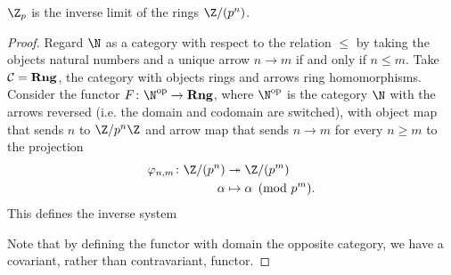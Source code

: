 \documentclass[10pt]{amsart}
\begin{document}
\begin{thm}\label{ex3}
  $\Z_p$ is the inverse limit of the rings $\Z/(p^n)$.
  \begin{proof}
    Regard $\N$ as a category with respect to the relation $\leq$ by taking the objects natural numbers and a unique arrow $n \rightarrow m$ if and only if $n \leq m$.
    Take $\mathcal{C} = {\bf Rng}$, the category with objects rings and arrows ring homomorphisms.
    Consider the functor $F \colon \N^\text{op} \rightarrow {\bf Rng}$, where $\N^\text{op}$ is the category $\N$ with the arrows reversed (i.e. the domain and codomain are switched), with object map that sends $n$ to $\Z/p^n\Z$ and
    arrow map that sends $n \rightarrow m$ for every $n \geq m$ to the projection 
    \begin{align*}
      \varphi_{n,m} \colon \Z/(p^n) &\twoheadrightarrow \Z/(p^m)\\
      \alpha &\mapsto \alpha \pmod{p^m}.
    \end{align*}
    This defines the inverse system
    \begin{center}
    \end{center}
    Note that by defining the functor with domain the opposite category, we have a covariant, rather than contravariant, functor.
    

\end{proof}
\end{thm}
\end{document}
